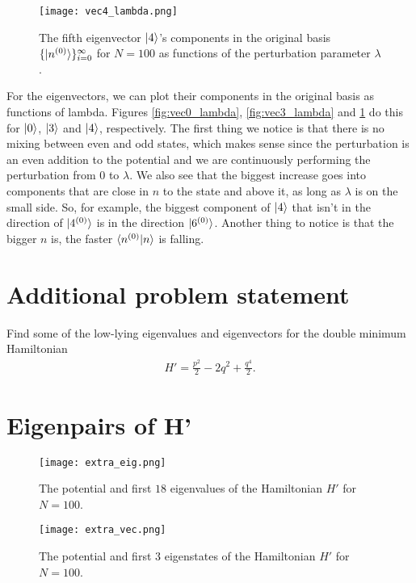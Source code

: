 \documentclass[10pt,a4paper,twocolumn]{article}
\begin{document}
\begin{figure}
\centering
\captionsetup{justification=centering}
\texttt{[image: vec4\_lambda.png]}
\caption{The fifth eigenvector $\ket{4}$'s components in the original basis $\{\ket{n^{(0)}}\}_{i=0}^{\infty}$ for $N=100$ as functions of the perturbation parameter $\lambda$.}
\label{fig:vec4_lambda}
\end{figure}

For the eigenvectors, we can plot their components in the original basis as functions of lambda. Figures \ref{fig:vec0_lambda}, \ref{fig:vec3_lambda} and \ref{fig:vec4_lambda} do this for $\ket{0}$, $\ket{3}$ and $\ket{4}$, respectively. The first thing we notice is that there is no mixing between even and odd states, which makes sense since the perturbation is an even addition to the potential and we are continuously performing the perturbation from $0$ to $\lambda$. We also see that the biggest increase goes into components that are close in $n$ to the state and above it, as long as $\lambda$ is on the small side. So, for example, the biggest component of $\ket{4}$ that isn't in the direction of $\ket{4^{(0)}}$ is in the direction $\ket{6^{(0)}}$. Another thing to notice is that the bigger $n$ is, the faster $\braket{n^{(0)}|n}$ is falling.


\section{Additional problem statement}

Find some of the low-lying eigenvalues and eigenvectors for the double minimum Hamiltonian
%
\begin{align}
H' = \frac{p^2}{2} - 2q^2 + \frac{q^4}{2}.
\end{align}


\section{Eigenpairs of H'}

\begin{figure}
\centering
\captionsetup{justification=centering}
\texttt{[image: extra\_eig.png]}
\caption{The potential and first $18$ eigenvalues of the Hamiltonian $H'$ for $N=100$.}
\label{fig:extra_eig}
\end{figure}

\begin{figure}
\centering
\captionsetup{justification=centering}
\texttt{[image: extra\_vec.png]}
\caption{The potential and first $3$ eigenstates of the Hamiltonian $H'$ for $N=100$.}
\label{fig:extra_vec}
\end{figure}
\end{document}
